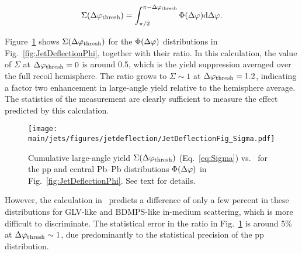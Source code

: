 \begin{equation}
\Sigma(\Delta\varphi_{\mathrm{thresh}}) = 
\int_{\pi/2}^{\pi-\Delta\varphi_{\mathrm{thresh}}}
\Phi(\Delta\varphi)\mathrm{d}\Delta\varphi.
\label{eq:Sigma}
\end{equation}

\noindent
Figure~\ref{fig:JetDeflectionSigma} shows $\Sigma(\Delta\varphi_{\mathrm{thresh}})$ for the $\Phi(\Delta\varphi)$ distributions in Fig.~\ref{fig:JetDeflectionPhi}, together with their ratio. In this calculation, the value of $\Sigma$ at $\Delta\varphi_{\mathrm{thresh}}=0$ is around 0.5, which is the yield suppression averaged over the full recoil hemisphere. The ratio grows to $\Sigma\sim1$ at $\Delta\varphi_{\mathrm{thresh}}=1.2$, indicating a factor two enhancement in large-angle yield relative to the hemisphere average. The statistics of the measurement are clearly sufficient to measure the effect predicted by this calculation.
\begin{figure}[tbh!]
\centering
\texttt{[image: \\main/jets/figures/jetdeflection/JetDeflectionFig\_Sigma.pdf]}
\caption{Cumulative large-angle yield $\Sigma(\Delta\varphi_{\mathrm{thresh}})$ (Eq.~\ref{eq:Sigma}) vs. \dphithresh\ for the pp and central Pb--Pb distributions $\Phi(\Delta\varphi)$ in Fig.~\ref{fig:JetDeflectionPhi}. See text for details. 
}
\label{fig:JetDeflectionSigma}
\end{figure}
However, the calculation in~\cite{Gyulassy:2018qhr} predicts a difference of only a few percent in these distributions for GLV-like and BDMPS-like in-medium scattering, which is more difficult to discriminate. The statistical error in the ratio in Fig.~\ref{fig:JetDeflectionSigma} is around 5\% at $\Delta\varphi_{\mathrm{thresh}}\sim1$, due predominantly to the statistical precision of the pp distribution. %


